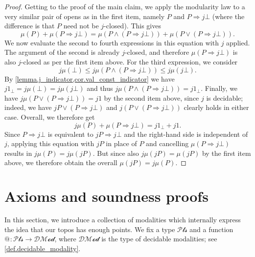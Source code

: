 \documentclass[11pt, oneside, article]{memoir}
\makeatletter
\theoremstyle{plain}
\theoremstyle{definition}
\theoremstyle{remark}
\newcommand{\ind}[1]{1_{#1}}
\newcommand{\pt}{k}				%
\newcommand{\Pts}{\mathcal{Pts}}		%
\newcommand{\decmod}{\mathcal{DMod}}
\newcommand{\AtSymbol}{{@}}
\newcommand{\At}[1][\pt]{\AtSymbol_{#1}}
\newcommand{\imp}{\Rightarrow}
\makeatother
\begin{document}
\begin{proof}
	Getting to the proof of the main claim, we apply the modularity law to a very similar pair of opens as in the first item, namely $P$ and $P \Rightarrow j\bot$ (where the difference is that $P$ need not be $j$-closed). This gives
	\[
		\mu(P) + \mu(P \Rightarrow j\bot) = \mu(P \land (P \Rightarrow j\bot)) + \mu(P \lor (P \Rightarrow j\bot)).
	\]
	We now evaluate the second to fourth expressions in this equation with $j$ applied. The argument of the second is already $j$-closed, and therefore $\mu(P \Rightarrow j\bot)$ is also $j$-closed as per the first item above. For the third expression, we consider
	\[
		j \mu(\bot) \le j \mu(P \land (P \Rightarrow j\bot)) \le j \mu(j\bot).
	\]
	By \cref{lemma.j_indicator,cor.val_const_indicator} we have $j \ind{\bot}=j \mu(\bot)=j\mu(j\bot)$ and thus $j \mu(P \land (P \Rightarrow j\bot)) =  j \ind{\bot}$. Finally, we have $j \mu(P \lor (P \Rightarrow j\bot)) = j 1$ by the second item above, since $j$ is decidable; indeed, we have $jP\vee(P\imp j\bot)$ and $j(P \lor (P \Rightarrow j\bot))$ clearly holds in either case. Overall, we therefore get
	\[
		j \mu(P) + \mu(P \Rightarrow j\bot) = j \ind{\bot} + j 1.
	\]
	Since $P \Rightarrow j\bot$ is equivalent to $jP \Rightarrow j\bot$ and the right-hand side is independent of $j$, applying this equation with $jP$ in place of $P$ and cancelling $\mu(P \Rightarrow j\bot)$ results in $j \mu(P) = j \mu(jP)$. But since also $j \mu(jP) = \mu(jP)$ by the first item above, we therefore obtain the overall $\mu(jP) = j \mu(P)$.
\end{proof}


\chapter{Axioms and soundness proofs}

In this section, we introduce a collection of modalities which internally express the idea that our topos has enough points. We fix a type $\Pts$ and a function $\At[]\colon\Pts\to\decmod$, where $\decmod$ is the type of decidable modalities; see \cref{def.decidable_modality}. 
\end{document}
